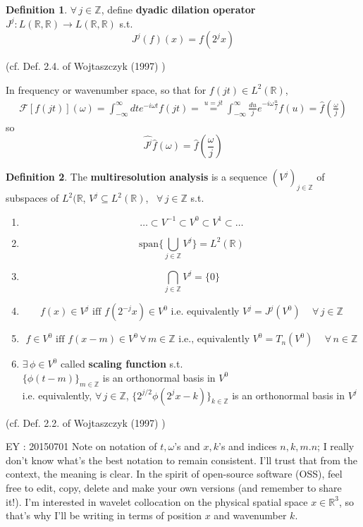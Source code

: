 \documentclass[twoside]{amsart}
\theoremstyle{plain}
\theoremstyle{definition}
\newtheorem{definition}{Definition}
\theoremstyle{remark}
\numberwithin{equation}{section}
\begin{document}
\begin{definition}
  $\forall \, j \in \mathbb{Z}$, define \textbf{dyadic dilation operator } $J^j : L(\mathbb{R}, \mathbb{R}) \to L(\mathbb{R}, \mathbb{R})$ s.t.
\[
J^j(f)(x) = f(2^jx)
\]
\end{definition} (cf. Def. 2.4. of Wojtaszczyk (1997) \cite{PWojtaszczyk1997})

In frequency or wavenumber space, so that for $f(jt) \in L^2(\mathbb{R})$,
\[
\begin{gathered}
  \mathcal{F}[f(jt)](\omega) = \int_{-\infty}^{\infty} dt e^{-i\omega t} f(jt) = \overset{ u = jt}{=} \int_{-\infty}^{\infty} \frac{du}{j} e^{-i \omega \frac{u}{j} } f(u) = \widehat{f}( \frac{\omega}{j} )
\end{gathered}
\]
so 
\[
\widehat{J^j}\widehat{f}(\omega) = \widehat{f}(\frac{\omega}{j} )
\]

\begin{definition}\label{Def:multiresolutionanalysis}
The \textbf{multiresolution analysis} is a sequence $(V^j)_{j\in \mathbb{Z}}$ of subspaces of $L^2(\mathbb{R}$, $V^j \subseteq L^2(\mathbb{R})$, \, $\forall \, j \in \mathbb{Z}$ s.t.
\begin{enumerate}
\item \[
\dots \subset V^{-1} \subset V^0 \subset V^1 \subset \dots 
\]
\item \[
\text{span}\lbrace \bigcup_{j\in \mathbb{Z}}V^j \rbrace = L^2(\mathbb{R})
\]
\item 
\[
\bigcap_{j\in \mathbb{Z}} V^j = \lbrace 0 \rbrace
\]
\item 
\[
f(x) \in V^j \text{ iff } f(2^{-j}x) \in V^0 \text{ i.e. equivalently } V^j = J^{j}(V^0) \quad \, \forall \, j \in \mathbb{Z}
\]
\item \[
f\in V^0 \text{ iff } f(x-m) \in V^0 \, \forall \, m \in \mathbb{Z} \text{ i.e., equivalently } V^0 = T_n(V^0) \quad \, \forall \, n \in \mathbb{Z}
\]
\item $\exists \, \phi \in V^0$ called \textbf{ scaling function } s.t. \\
$\lbrace \phi(t-m) \rbrace_{m\in \mathbb{Z}}$ is an orthonormal basis in $V^0$ \\
i.e. equivalently, $\forall \, j \in \mathbb{Z}$, $\lbrace 2^{j/2} \phi(2^jx - k) \rbrace_{k\in \mathbb{Z}}$ is an orthonormal basis in $V^j$
\end{enumerate}
\end{definition}
 (cf. Def. 2.2. of Wojtaszczyk (1997) \cite{PWojtaszczyk1997})

EY : 20150701 Note on notation of $t,\omega$'s and $x,k$'s and indices $n,k,m.n$; I really don't know what's the best notation to remain consistent.  I'll trust that from the context, the meaning is clear.  In the spirit of open-source software (OSS), feel free to edit, copy, delete and make your own versions (and remember to share it!).  I'm interested in wavelet collocation on the physical spatial space $x \in \mathbb{R}^3$, so that's why I'll be writing in terms of position $x$ and wavenumber $k$.  
\end{document}
